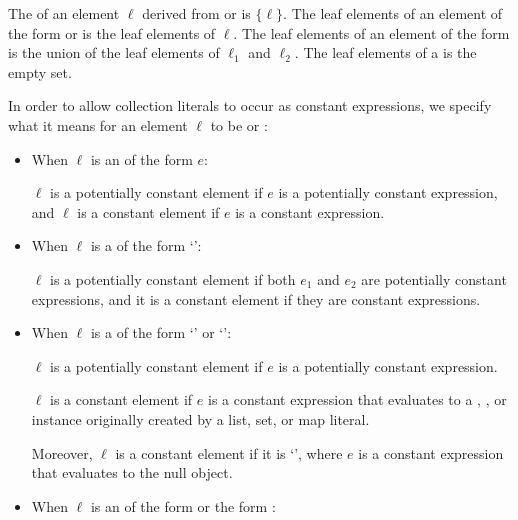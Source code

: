 \documentclass[makeidx]{article}
\begin{document}
{

\LMHash{}%
The  of an element $\ell$ derived from
 or 
is $\{\ell\}$.
The leaf elements of an element of the form
 or
is the leaf elements of $\ell$.
The leaf elements of an element of the form
is the union of the leaf elements of $\ell_1$ and $\ell_2$.
The leaf elements of a  is the empty set.


\LMHash{}%
In order to allow collection literals to occur as constant expressions,
we specify what it means for an element $\ell$
to be
or
:

\begin{itemize}
\item
  When $\ell$ is an  of the form $e$:

  $\ell$ is a potentially constant element
  if $e$ is a potentially constant expression,
  and $\ell$ is a constant element
  if $e$ is a constant expression.
\item
  When $\ell$ is a 
  of the form `':

  $\ell$ is a potentially constant element
  if both $e_1$ and $e_2$ are potentially constant expressions,
  and it is a constant element if they are constant expressions.
\item
  When $\ell$ is a 
  of the form `' or `':

  $\ell$ is a potentially constant element
  if $e$ is a potentially constant expression.

  $\ell$ is a constant element
  if $e$ is a constant expression that evaluates
  to a , , or  instance
  originally created by a list, set, or map literal.

  Moreover, $\ell$ is a constant element if it is `',
  where $e$ is a constant expression that evaluates
  to the null object.
\item
  When $\ell$ is an 
  of the form
  or the form
  :


\end{itemize}}
\end{document}
